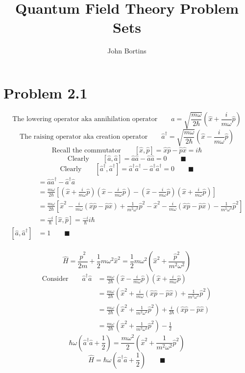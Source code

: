 \documentclass{amsart}
\title{Quantum Field Theory Problem Sets}
\author{John Bortins}
\begin{document}
 
\maketitle{}
 
\section*{Problem 2.1}

\[\text{The lowering operator aka annihilation operator}\qquad\hat{a}  = \sqrt{\frac{m\omega}{2\hbar}}\left(\hat{x} + \frac{i}{m\omega}\hat{p}\right)  \]
\[\text{The raising operator aka creation operator}\qquad\hat{a}^\dagger  = \sqrt{\frac{m\omega}{2\hbar}}\left(\hat{x} - \frac{i}{m\omega}\hat{p}\right)  \]
\[\text{Recall the commutator}\qquad[\hat{x},\hat{p}]  = \hat{x}\hat{p}-\hat{p}\hat{x}=i\hbar \]
\[\text{Clearly}\qquad [\hat{a},\hat{a}]  = \hat{a}\hat{a}-\hat{a}\hat{a}=0 \qquad \blacksquare \]
\[\text{Clearly}\qquad [\hat{a}^\dagger,\hat{a}^\dagger]  = \hat{a}^\dagger\hat{a}^\dagger-\hat{a}^\dagger\hat{a}^\dagger=0 \qquad \blacksquare \]
\begin{align*}
    [\hat{a},\hat{a}^\dagger] &= \hat{a}\hat{a}^\dagger-\hat{a}^\dagger\hat{a}\\
    &= \frac{m\omega}{2\hbar}\left[\left(\hat{x} + \frac{i}{m\omega}\hat{p}\right)\left(\hat{x} - \frac{i}{m\omega}\hat{p}\right)-\left(\hat{x} - \frac{i}{m\omega}\hat{p}\right)\left(\hat{x} + \frac{i}{m\omega}\hat{p}\right)\right]\\
    &= \frac{m\omega}{2\hbar}\left[\hat{x}^2 - \frac{i}{m\omega}(\hat{x}\hat{p}-\hat{p}\hat{x}) + \frac{1}{m^2\omega^2}\hat{p}^2-\hat{x}^2 - \frac{i}{m\omega}(\hat{x}\hat{p}-\hat{p}\hat{x}) - \frac{1}{m^2\omega^2}\hat{p}^2\right]\\
    &= \frac{-i}{\hbar}\left[ \hat{x},\hat{p}\right]= \frac{-i}{\hbar}i\hbar\\
    [\hat{a},\hat{a}^\dagger] &=1 \qquad\blacksquare\\
\end{align*}

\[\hat{H}=\frac{\hat{p}^2}{2m}+\frac{1}{2}m\omega^2\hat{x}^2=\frac{1}{2}m\omega^2\left(\hat{x}^2+\frac{\hat{p}^2}{m^2\omega^2}\right) \]
\begin{align*}
    \text{Consider}\qquad \hat{a}^\dagger \hat{a} &=\frac{m\omega}{2\hbar}\left(\hat{x} - \frac{i}{m\omega}\hat{p}\right)\left(\hat{x} + \frac{i}{m\omega}\hat{p}\right)\\
    &=\frac{m\omega}{2\hbar}\left(\hat{x}^2 + \frac{i}{m\omega}(\hat{x}\hat{p}-\hat{p}\hat{x}) + \frac{1}{m^2\omega^2}\hat{p}^2\right)\\
    &=\frac{m\omega}{2\hbar}\left(\hat{x}^2 + \frac{1}{m^2\omega^2}\hat{p}^2\right) + \frac{i}{2\hbar}(\hat{x}\hat{p}-\hat{p}\hat{x})\\
    &=\frac{m\omega}{2\hbar}\left(\hat{x}^2 + \frac{1}{m^2\omega^2}\hat{p}^2\right) - \frac{1}{2}
\end{align*}
\[\hbar\omega\left(\hat{a}^\dagger \hat{a} +\frac{1}{2}\right)=\frac{m\omega^2}{2}\left(\hat{x}^2 + \frac{1}{m^2\omega^2}\hat{p}^2\right)   \]
\[\hat{H}=\hbar\omega\left(\hat{a}^\dagger \hat{a} +\frac{1}{2}\right)\qquad\blacksquare \]
\end{document}
